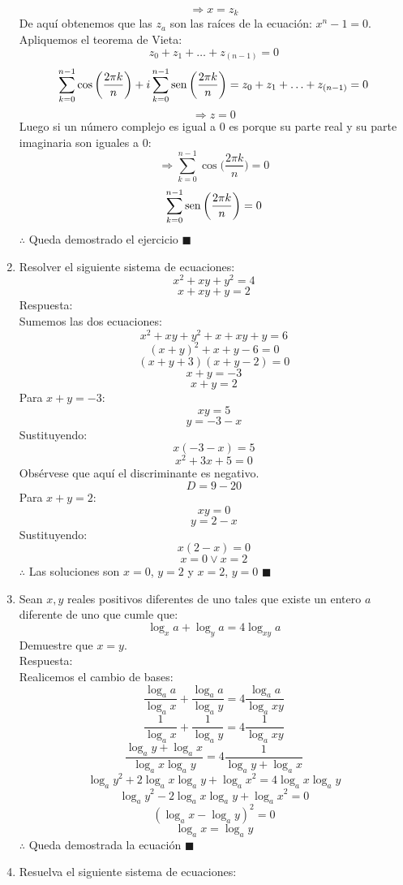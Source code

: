 \documentclass{book}
\newcommand{\sen}{\mathop{\rm sen}\nolimits} %
\begin{document}
\begin{enumerate}
        $$\Rightarrow x=z_k$$
        De aquí obtenemos que las $z_a$ son las raíces de la ecuación:   $x^n-1=0$. Apliquemos el teorema de Vieta:
        $$z_0+z_1+\ldots+z_(n-1)=0$$
        $$\sum_{k=0}^{n-1}\cos{\bigg(\frac{2\pi k}{n}\bigg)} +i\sum_{k=0}^{n-1}\sen{\bigg(\frac{2\pi k}{n}\bigg)}=z_0+z_1+\ldots+z_{(n-1)}=0$$
        $$\Rightarrow z=0$$
        Luego si un número complejo es igual a 0 es porque su parte real y su parte imaginaria son iguales a 0:
        $$\Rightarrow \sum_{k=0}^{n-1}\cos{\bigg(\frac{2\pi k}{n}\bigg)} =0$$
        $$\sum_{k=0}^{n-1}\sen{\bigg(\frac{2\pi k}{n}\bigg)}=0$$
        $\therefore$ Queda demostrado el ejercicio $\blacksquare$\\
        \item Resolver el siguiente sistema de ecuaciones:
        $$x^2+xy+y^2=4$$
        $$x+xy+y=2$$
        Respuesta:\\
        Sumemos las dos ecuaciones:
        $$x^2+xy+y^2+x+xy+y=6$$
        $${(x+y)}^2+x+y-6=0$$
        $$(x+y+3)(x+y-2)=0$$
        $$x+y=-3$$
        $$x+y=2$$
        Para $x+y=-3$:
        $$xy=5$$
        $$y=-3-x$$
        Sustituyendo:
        $$x(-3-x)=5$$
        $$x^2+3x+5=0$$
        Obsérvese que aquí el discriminante es negativo.
        $$D=9-20$$
        Para $x+y=2$:
        $$xy=0$$
        $$y=2-x$$
        Sustituyendo:
        $$x(2-x)=0$$
        $$x=0  \vee  x=2$$
        $\therefore$ Las soluciones son $x=0$, $y=2$  y  $x=2$, $y=0$ $\blacksquare$\\
        \item Sean $x,y$ reales positivos diferentes de uno tales que existe un entero $a$ diferente de uno que cumle que:
        $$\log_{x}a+\log_{y}a=4\log_{xy}a$$
        Demuestre que $x=y$.\\
        Respuesta:\\
        Realicemos el cambio de bases:
        $$\frac{\log_{a}a}{\log_{a}x}+\frac{\log_{a}a}{\log_{a}y}=4  \frac{\log_{a}a}{\log_{a}xy}  $$
        $$\frac{1}{\log_{a}x} +\frac{1}{\log_{a}y}=4 \frac{1}{\log_{a}xy} $$
        $$\frac{\log_{a}y+\log_{a}x}{\log_{a}x\log_{a}y} =4 \frac{1}{\log_{a}y+\log_{a}x }$$
        $${\log_{a}y}^2+2 \log_{a}x \log_{a}y +{\log_{a}x}^2=4\log_{a}x \log_{a}y$$
        $${\log_{a}y}^2-2 \log_{a}x \log_{a}y +{\log_{a}x}^2=0$$
        $${(\log_{a}x -\log_{a}y )} ^2=0$$
        $$\log_{a}x =\log_{a}y $$
        $\therefore$ Queda demostrada la ecuación $\blacksquare$\\
        \item Resuelva el siguiente sistema de ecuaciones:

\end{enumerate}
\end{document}
